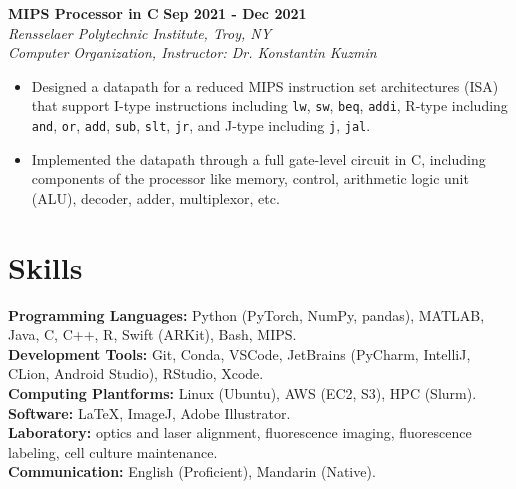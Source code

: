 \documentclass[letterpaper, 11pt]{article}
\begin{document}
    \textbf{MIPS Processor in C} \hfill 
    \textbf{Sep 2021 - Dec 2021} \\
    \textit{Rensselaer Polytechnic Institute, Troy, NY} \\
    \textit{Computer Organization, Instructor: Dr. Konstantin Kuzmin}
    \begin{itemize}
        \item Designed a datapath for a reduced MIPS instruction set architectures (ISA) that support I-type instructions including \verb|lw|, \verb|sw|, \verb|beq|, \verb|addi|, R-type including \verb|and|, \verb|or|, \verb|add|, \verb|sub|, \verb|slt|, \verb|jr|, and J-type including \verb|j|, \verb|jal|.
        \item Implemented the datapath through a full gate-level circuit in C, including components of the processor like memory, control, arithmetic logic unit (ALU), decoder, adder, multiplexor, etc.
    \end{itemize}


\section{Skills}


    \textbf{Programming Languages:} Python (PyTorch, NumPy, pandas), MATLAB, Java, C, C++, R, Swift (ARKit), Bash, MIPS. \\
    \textbf{Development Tools:} Git, Conda, VSCode, JetBrains (PyCharm, IntelliJ, CLion, Android Studio), RStudio, Xcode. \\
    \textbf{Computing Plantforms:} Linux (Ubuntu), AWS (EC2, S3), HPC (Slurm). \\
    \textbf{Software:} LaTeX, ImageJ, Adobe Illustrator. \\
    \textbf{Laboratory:} optics and laser alignment, fluorescence imaging, fluorescence labeling, cell culture maintenance. \\
    \textbf{Communication:} English (Proficient), Mandarin (Native).
\end{document}
